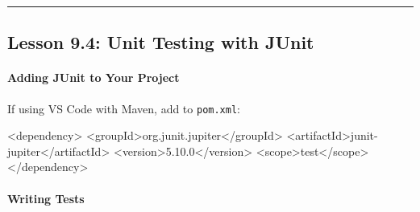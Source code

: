 \documentclass[
  justified,
  openright,
]{tufte-book}
\let\subsubsection\paragraph
\let\paragraph\paragraph
\newcommand{\KeywordTok}[1]{\textcolor{BrandBlue}{#1}}
\newcommand{\NormalTok}[1]{#1}
\newenvironment{Shaded}{%
  \begin{snugshade}
}{%
  \end{snugshade}
}
\let\subsubsection\paragraph
\let\paragraph\paragraph
\begin{document}
\begin{center}\rule{0.5\linewidth}{0.5pt}\end{center}

\subsection{Lesson 9.4: Unit Testing with
JUnit}\label{lesson-9.4-unit-testing-with-junit}

\subsubsection{Adding JUnit to Your
Project}\label{adding-junit-to-your-project}

If using VS Code with Maven, add to \texttt{pom.xml}:

\begin{Shaded}
\begin{Highlighting}[]
\NormalTok{\textless{}}\KeywordTok{dependency}\NormalTok{\textgreater{}}
\NormalTok{    \textless{}}\KeywordTok{groupId}\NormalTok{\textgreater{}org.junit.jupiter\textless{}/}\KeywordTok{groupId}\NormalTok{\textgreater{}}
\NormalTok{    \textless{}}\KeywordTok{artifactId}\NormalTok{\textgreater{}junit{-}jupiter\textless{}/}\KeywordTok{artifactId}\NormalTok{\textgreater{}}
\NormalTok{    \textless{}}\KeywordTok{version}\NormalTok{\textgreater{}5.10.0\textless{}/}\KeywordTok{version}\NormalTok{\textgreater{}}
\NormalTok{    \textless{}}\KeywordTok{scope}\NormalTok{\textgreater{}test\textless{}/}\KeywordTok{scope}\NormalTok{\textgreater{}}
\NormalTok{\textless{}/}\KeywordTok{dependency}\NormalTok{\textgreater{}}
\end{Highlighting}
\end{Shaded}

\subsubsection{Writing Tests}\label{writing-tests}
\end{document}
